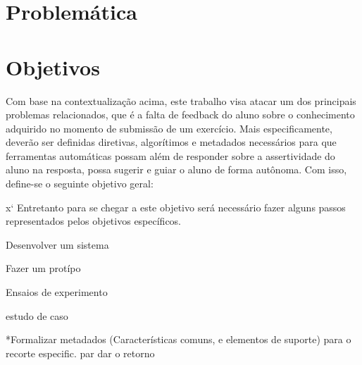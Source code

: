     
    
\section{Problemática}
    
    
\section{Objetivos}\label{sec:objetivos}

Com base na contextualização acima, este trabalho visa atacar um dos principais problemas relacionados, que é a falta de feedback do aluno sobre o conhecimento adquirido no momento de submissão de um exercício. Mais especificamente, deverão ser definidas diretivas, algorítimos e metadados necessários para que ferramentas automáticas possam além de responder sobre a assertividade do aluno na resposta, possa sugerir e guiar o aluno de forma autônoma. Com isso, define-se o seguinte objetivo geral:

\medskip
\noindent {}
\medskip

x`  Entretanto para se chegar a este objetivo será necessário fazer alguns passos representados pelos objetivos específicos.


Desenvolver um sistema

Fazer um protípo

Ensaios de experimento

estudo de caso

*Formalizar metadados (Características comuns, e elementos de suporte) para o recorte especific. par dar o retorno

